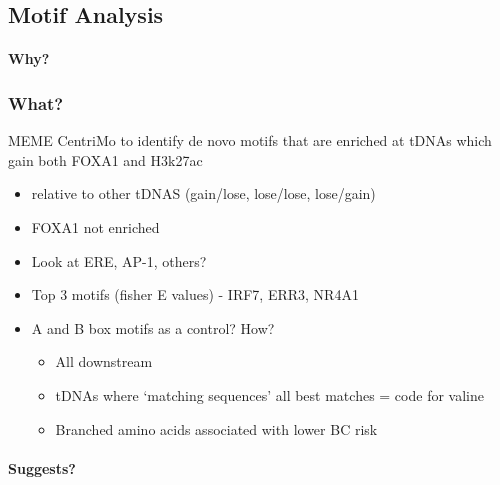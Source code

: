 \documentclass[
  12pt,
]{article}
\begin{document}
\hypertarget{motif-analysis-1}{%
\subsection{Motif Analysis}\label{motif-analysis-1}}

\hypertarget{why}{%
\paragraph{Why?}\label{why}}

\hypertarget{what}{%
\subsubsection{What?}\label{what}}

MEME CentriMo to identify de novo motifs that are enriched at tDNAs which gain both FOXA1 and H3k27ac

\begin{itemize}
\item
  relative to other tDNAS (gain/lose, lose/lose, lose/gain)
\item
  FOXA1 not enriched
\item
  Look at ERE, AP-1, others?
\item
  Top 3 motifs (fisher E values) - IRF7, ERR3, NR4A1
\item
  A and B box motifs as a control?
  How?

  \begin{itemize}
  \item
    All downstream
  \item
    tDNAs where `matching sequences' all best matches = code for valine
  \item
    Branched amino acids associated with lower BC risk
  \end{itemize}
\end{itemize}

\hypertarget{suggests}{%
\paragraph{Suggests?}\label{suggests}}
\end{document}
